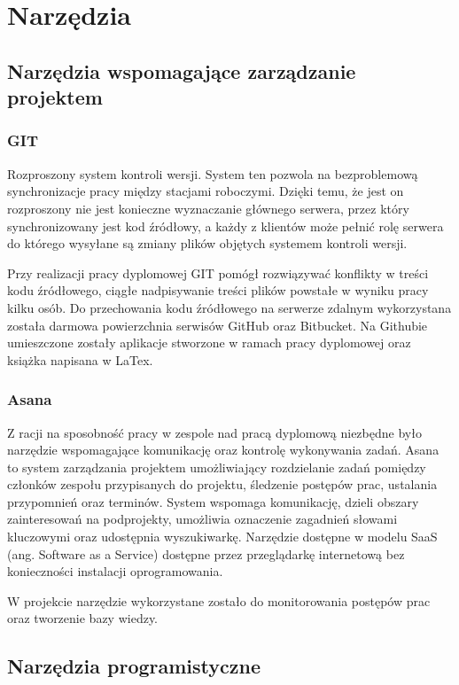 \section{Narzędzia}
\label{cha:Narzędzia}

\subsection{Narzędzia wspomagające zarządzanie projektem}

\subsubsection{GIT}
\label{sub:GIT}
Rozproszony system kontroli wersji. System ten pozwola na bezproblemową synchronizacje pracy między stacjami roboczymi. Dzięki temu, że jest on rozproszony nie jest konieczne wyznaczanie głównego serwera, przez który synchronizowany jest kod źródłowy, a każdy z klientów może pełnić rolę serwera do którego wysyłane są zmiany plików objętych systemem kontroli wersji.

Przy realizacji pracy dyplomowej GIT pomógł rozwiązywać konflikty w treści kodu źródłowego, ciągłe nadpisywanie treści plików powstałe w wyniku pracy kilku osób. Do przechowania kodu źródłowego na serwerze zdalnym wykorzystana została darmowa powierzchnia serwisów GitHub oraz Bitbucket. Na Githubie umieszczone zostały aplikacje stworzone w ramach pracy dyplomowej oraz książka napisana w LaTex.


\subsubsection{Asana}
\label{sub:Asana}

Z racji na sposobność pracy w zespole nad pracą dyplomową niezbędne było narzędzie wspomagające komunikację oraz kontrolę wykonywania zadań. Asana to system zarządzania projektem umożliwiający rozdzielanie zadań pomiędzy członków zespołu przypisanych do projektu, śledzenie postępów prac, ustalania przypomnień oraz terminów. System wspomaga komunikację, dzieli obszary zainteresowań na podprojekty, umożliwia oznaczenie zagadnień słowami kluczowymi oraz udostępnia wyszukiwarkę. Narzędzie dostępne w modelu SaaS (ang. Software as a Service) dostępne przez przeglądarkę internetową bez konieczności instalacji oprogramowania.

W projekcie narzędzie wykorzystane zostało do monitorowania postępów prac oraz tworzenie bazy wiedzy.

\subsection{Narzędzia programistyczne}

